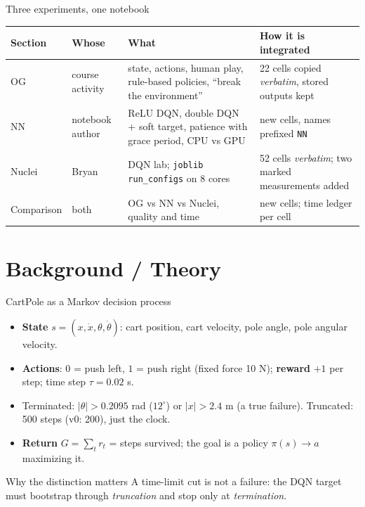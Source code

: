 \documentclass[aspectratio=169]{beamer}
\begin{document}
\begin{frame}{Three experiments, one notebook}
\small
\begin{table}
\centering
\begin{tabular}{p{1.9cm}p{3.1cm}p{4.9cm}p{4.3cm}}
\toprule
\textbf{Section} & \textbf{Whose} & \textbf{What} & \textbf{How it is integrated}\\
\midrule
OG & course activity & state, actions, human play, rule-based policies, ``break the environment'' & 22 cells copied \emph{verbatim}, stored outputs kept\\
NN & notebook author & ReLU DQN, double DQN + soft target, patience with grace period, CPU vs GPU & new cells, names prefixed \texttt{NN}\\
Nuclei & Bryan & DQN lab; \texttt{joblib} \texttt{run\_configs} on 8 cores & 52 cells \emph{verbatim}; two marked measurements added\\
Comparison & both & OG vs NN vs Nuclei, quality and time & new cells; time ledger per cell\\
\bottomrule
\end{tabular}
\end{table}
\end{frame}

\section{Background / Theory}

\begin{frame}{CartPole as a Markov decision process}
\begin{itemize}
  \item \textbf{State} $s=(x,\dot x,\theta,\dot\theta)$: cart position, cart velocity, pole angle, pole angular velocity.
  \item \textbf{Actions}: $0$ = push left, $1$ = push right (fixed force 10 N); \textbf{reward} $+1$ per step; time step $\tau=0.02$ s.
  \item \alert{Terminated}: $|\theta|>0.2095$ rad ($12^\circ$) or $|x|>2.4$ m (a true failure). \alert{Truncated}: 500 steps (v0: 200), just the clock.
  \item \textbf{Return} $G=\sum_t r_t$ = steps survived; the goal is a policy $\pi(s)\to a$ maximizing it.
\end{itemize}
\begin{block}{Why the distinction matters}
A time-limit cut is not a failure: the DQN target must bootstrap through \emph{truncation} and stop only at \emph{termination}.
\end{block}
\end{frame}
\end{document}
